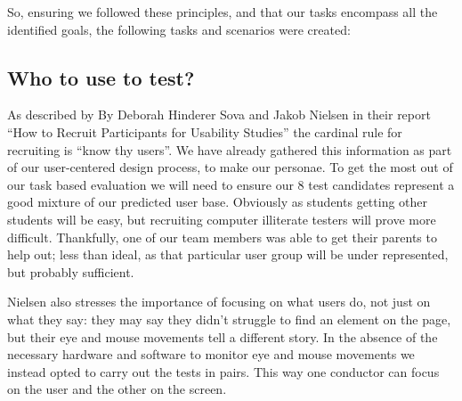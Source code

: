 So, ensuring we followed these principles, and that our tasks
encompass all the identified goals, the following tasks and scenarios
were created:






\subsection{Who to use to test?}

As described by By Deborah Hinderer Sova and Jakob Nielsen in their
report ``How to Recruit Participants for Usability
Studies'' the cardinal rule for recruiting is ``know
thy users''. We have already gathered this information as part of our
user-centered design process, to make our personae. To get the most
out of our task based evaluation we will need to ensure our 8 test
candidates represent a good mixture of our predicted user
base. Obviously as students getting other students will be easy, but
recruiting computer illiterate testers will prove more
difficult. Thankfully, one of our team members was able to get their
parents to help out; less than ideal, as that particular user group
will be under represented, but probably sufficient.

Nielsen also stresses the importance of focusing on what users do, not
just on what they say: they may say they didn't struggle to find an
element on the page, but their eye and mouse movements tell a
different story. In the absence of the necessary hardware and software
to monitor eye and mouse movements we instead opted to carry out the
tests in pairs. This way one conductor can focus on the user and the
other on the screen.

